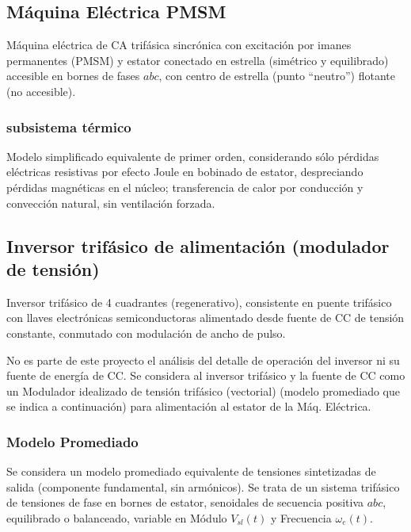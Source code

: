 \documentclass[a4paper, 10pt, onecolumn,journal]{ieeeconf}
\begin{document}
\subsection{\textbf{Máquina Eléctrica PMSM}}
Máquina eléctrica de CA trifásica sincrónica con excitación por imanes permanentes (PMSM) y estator conectado en estrella (simétrico y equilibrado) accesible en bornes de fases $abc$, con centro de estrella (punto “neutro”) flotante (no accesible).

\vspace*{0.2cm}
\subsubsection{\textbf{subsistema térmico}} Modelo simplificado equivalente de primer orden, considerando sólo pérdidas
eléctricas resistivas por efecto Joule en bobinado de estator, despreciando pérdidas magnéticas
en el núcleo; transferencia de calor por conducción y convección natural, sin ventilación forzada.

\subsection{\textbf{Inversor trifásico de alimentación (modulador de tensión)}}

Inversor trifásico de 4 cuadrantes (regenerativo), consistente en puente trifásico con llaves electrónicas semiconductoras alimentado desde fuente de CC de tensión constante, conmutado con modulación de ancho de pulso.

No es parte de este proyecto el análisis del detalle de operación del inversor ni su fuente de energía de CC. Se considera al inversor trifásico y la fuente de CC como un Modulador idealizado de tensión trifásico (vectorial) (modelo promediado que se indica a continuación) para alimentación al estator de la Máq. Eléctrica.


\subsubsection{\textbf{Modelo Promediado}}
Se considera un modelo promediado equivalente de tensiones sintetizadas de salida (componente fundamental, sin armónicos). Se trata de un sistema trifásico de tensiones de fase en bornes de estator, senoidales de secuencia positiva $abc$, equilibrado o balanceado, variable en Módulo $V_{sl}(t)$ y Frecuencia $\omega_e(t)$.
\end{document}
